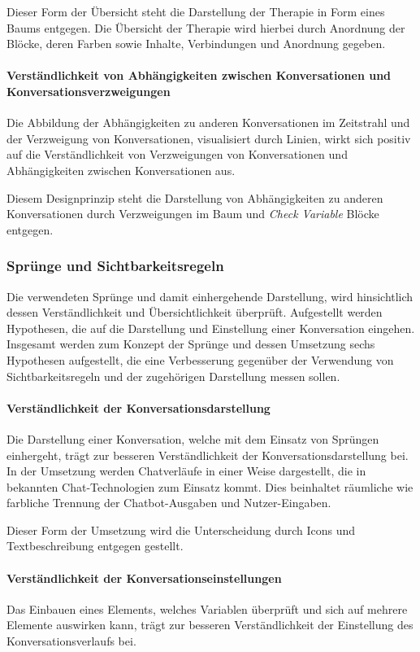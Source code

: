 Dieser Form der Übersicht steht die Darstellung der Therapie in Form eines Baums entgegen. Die Übersicht der Therapie wird hierbei durch Anordnung der Blöcke, deren Farben sowie Inhalte, Verbindungen und Anordnung gegeben. 


\paragraph{Verständlichkeit von Abhängigkeiten zwischen Konversationen und Konversationsverzweigungen}
Die Abbildung der Abhängigkeiten zu anderen Konversationen im Zeitstrahl und der Verzweigung von Konversationen, visualisiert durch Linien, wirkt sich positiv auf die Verständlichkeit von Verzweigungen von Konversationen und Abhängigkeiten zwischen Konversationen aus. 

Diesem Designprinzip steht die Darstellung von  Abhängigkeiten zu anderen Konversationen durch Verzweigungen im Baum und \emph{Check Variable} Blöcke entgegen. 
 

\subsubsection{Sprünge und Sichtbarkeitsregeln}
Die verwendeten Sprünge und damit einhergehende Darstellung, wird hinsichtlich dessen Verständlichkeit und Übersichtlichkeit überprüft. Aufgestellt werden Hypothesen, die auf die Darstellung und Einstellung einer Konversation eingehen. Insgesamt werden zum Konzept der Sprünge und dessen Umsetzung sechs Hypothesen aufgestellt, die eine Verbesserung gegenüber der Verwendung von Sichtbarkeitsregeln und der zugehörigen Darstellung messen sollen.

\paragraph{Verständlichkeit der Konversationsdarstellung}
Die Darstellung einer Konversation, welche mit dem Einsatz von Sprüngen einhergeht, trägt zur besseren Verständlichkeit der Konversationsdarstellung bei. In der Umsetzung werden Chatverläufe in einer Weise dargestellt, die in bekannten Chat-Technologien zum Einsatz kommt. Dies beinhaltet räumliche wie farbliche Trennung der Chatbot-Ausgaben und Nutzer-Eingaben.

Dieser Form der Umsetzung wird die Unterscheidung durch Icons und Textbeschreibung entgegen gestellt.


\paragraph{Verständlichkeit der Konversationseinstellungen}
Das Einbauen eines Elements, welches Variablen überprüft und sich auf mehrere Elemente auswirken kann, trägt zur besseren Verständlichkeit der Einstellung des Konversationsverlaufs bei.


